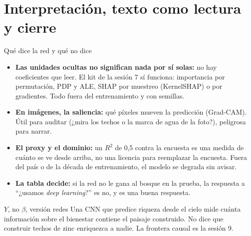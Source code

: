 \documentclass{beamer}
\newcommand{\1}{\mathbb{I}}
\begin{document}
\section{Interpretación, texto como lectura y cierre}
\begin{frame}[noframenumbering]
\tableofcontents[currentsection]
\end{frame}

\begin{frame}{Qué dice la red y qué no dice}
\small
\begin{itemize}\itemsep3pt
  \item \textbf{Las unidades ocultas no significan nada por sí solas:} no hay coeficientes que leer. El kit de la sesión 7 sí funciona: importancia por permutación, PDP y ALE, SHAP por muestreo (KernelSHAP) o por gradientes. Todo fuera del entrenamiento y con semillas. \pause
  \item \textbf{En imágenes, la saliencia:} qué píxeles mueven la predicción (Grad-CAM). Útil para auditar (¿mira los techos o la marca de agua de la foto?), peligrosa para narrar. \pause
  \item \textbf{El proxy y el dominio:} un $R^2$ de 0,5 contra la encuesta es una medida de cuánto se ve desde arriba, no una licencia para reemplazar la encuesta. Fuera del país o de la década de entrenamiento, el modelo se degrada sin avisar. \pause
  \item \textbf{La tabla decide:} si la red no le gana al bosque en la prueba, la respuesta a ``¿usamos \emph{deep learning}?'' es no, y es una buena respuesta.
\end{itemize}
\pause
\begin{block}{$Y$, no $\beta$, versión redes}
Una CNN que predice riqueza desde el cielo mide cuánta información sobre el bienestar contiene el paisaje construido. No dice que construir techos de zinc enriquezca a nadie. La frontera causal es la sesión 9.
\end{block}
\end{frame}
\end{document}
